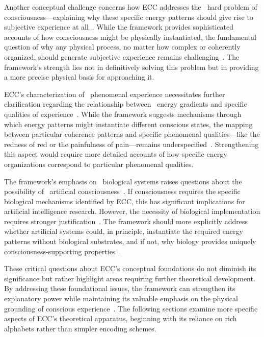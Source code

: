 Another conceptual challenge concerns how ECC addresses the~ hard problem of consciousness—explaining why these specific energy patterns should give rise to subjective experience at all~\cite{chalmers2010character}. While the framework provides sophisticated accounts of how consciousness might be physically instantiated, the fundamental question of why any physical process, no matter how complex or coherently organized, should generate subjective experience remains challenging~\cite{goff2019galileo, noe2009out}. The framework's strength lies not in definitively solving this problem but in providing a more precise physical basis for approaching it.

ECC's characterization of~ phenomenal experience necessitates further clarification regarding the relationship between~ energy gradients and specific qualities of experience~\cite{merleau2012phenomenology}. While the framework suggests mechanisms through which energy patterns might instantiate different conscious states, the mapping between particular coherence patterns and specific phenomenal qualities—like the redness of red or the painfulness of pain—remains underspecified~\cite{thompson2014waking, koch2019feeling}. Strengthening this aspect would require more detailed accounts of how specific energy organizations correspond to particular phenomenal qualities.

The framework's emphasis on~ biological systems raises questions about the possibility of~ artificial consciousness~\cite{dennett2017bacteria}. If consciousness requires the specific biological mechanisms identified by ECC, this has significant implications for artificial intelligence research. However, the necessity of biological implementation requires stronger justification~\cite{block2009comparing}. The framework should more explicitly address whether artificial systems could, in principle, instantiate the required energy patterns without biological substrates, and if not, why biology provides uniquely consciousness-supporting properties~\cite{kauffman2019world}.

These critical questions about ECC's conceptual foundations do not diminish its significance but rather highlight areas requiring further theoretical development. By addressing these foundational issues, the framework can strengthen its explanatory power while maintaining its valuable emphasis on the physical grounding of conscious experience~\cite{varela2016embodied, koch2019feeling}. The following sections examine more specific aspects of ECC's theoretical apparatus, beginning with its reliance on rich alphabets rather than simpler encoding schemes.

